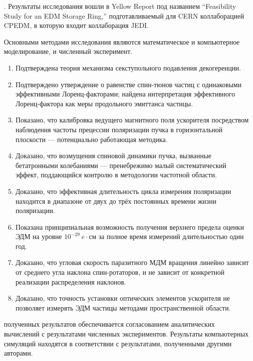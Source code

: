{\influence}. Результаты исследования вошли в Yellow Report под названием ``Feasibility Study for an EDM Storage Ring,'' подготавливаемый для CERN коллаборацией CPEDM, в которую входит коллаборация JEDI.



{\methods} Основными методами исследования являются математическое и компьютерное моделирование, и численный эксперимент.

{}
\begin{enumerate}
	\item Подтверждена теория механизма секступольного подавления декогеренции. %
  	\item Подтверждено утверждение о равенстве спин-тюнов частиц с одинаковыми эффективными Лоренц-факторами; найдена интерпретация эффективного Лоренц-фактора как меры продольного эмиттанса частицы. %
  	\item Показано, что калибровка ведущего магнитного поля ускорителя посредством наблюдения частоты прецессии поляризации пучка в горизонтальной плоскости --- потенциально работающая методика.
  	\item Доказано, что возмущения спиновой динамики пучка, вызванные бетатронными колебаниями --- пренебрежимо малый систематический эффект, поддающийся контролю в методологии частотной области. %
  	\item Доказано, что эффективная длительность цикла измерения поляризации находится в диапазоне от двух до трёх постоянных времени жизни поляризации. %
  	\item Показана принципиальная возможность получения верхнего предела оценки ЭДМ на уровне $10^{-29}~e\cdot$см за полное время измерений длительностью один год. %
  	\item Доказано, что угловая скорость паразитного МДМ вращения линейно зависит от среднего угла наклона спин-ротаторов, и не зависит от конкретной реализации распределения наклонов. %
  	\item Доказано, что точность установки оптических элементов ускорителя не позволяет измерять ЭДМ частицы методами пространственной области. %
\end{enumerate}

{\reliability} полученных результатов обеспечивается согласованием аналитических вычислений с результатами численных экспериментов. Результаты компьютерных симуляций находятся в соответствии с результатами, полученными другими авторами.


